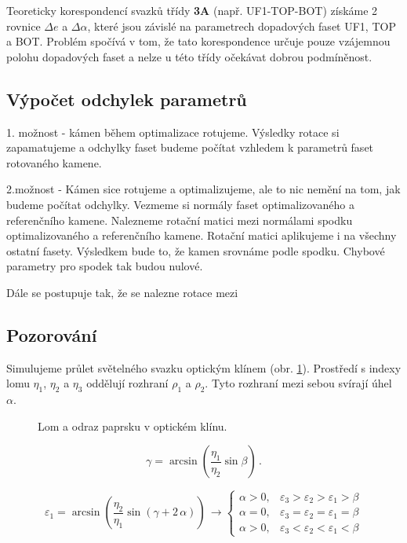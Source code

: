  
Teoreticky korespondencí svazků třídy \textbf{3A} (např. UF1-TOP-BOT) získáme 2 rovnice $\Delta e$ a $\Delta \alpha$, které jsou závislé na parametrech dopadových faset UF1, TOP a BOT. Problém spočívá v tom, že tato korespondence určuje pouze vzájemnou polohu dopadových faset a nelze u této třídy očekávat dobrou podmíněnost. 


\subsection{Výpočet odchylek parametrů}

1. možnost - kámen během optimalizace rotujeme. Výsledky rotace si zapamatujeme a odchylky faset budeme počítat vzhledem k parametrů faset rotovaného kamene. 

2.možnost - Kámen sice rotujeme a optimalizujeme, ale to nic nemění na tom, jak budeme počítat odchylky. Vezmeme si normály faset optimalizovaného a referenčního kamene. Nalezneme rotační matici mezi normálami spodku optimalizovaného a referenčního kamene. Rotační matici aplikujeme i na všechny ostatní fasety. Výsledkem bude to, že kamen srovnáme podle spodku. Chybové parametry pro spodek tak budou nulové.

Dále se postupuje tak, že se nalezne rotace mezi 

\subsection{Pozorování}

Simulujeme průlet světelného svazku optickým klínem (obr. \ref{fig:wedge}). Prostředí s indexy lomu $\eta_1$, $\eta_2$ a $\eta_3$ oddělují rozhraní $\rho_1$ a $\rho_2$. Tyto rozhraní mezi sebou svírají úhel $\alpha$.
\begin{figure}[h!]
\begin{center}
\scalebox{0.8}{ }
\end{center}
\caption{Lom a odraz paprsku v optickém klínu.}
\label{fig:wedge}
\end{figure}

\begin{equation}
\gamma = \arcsin{\left(\frac{\eta_1}{\eta_2}\sin{\beta}\right)}\,.
\end{equation}

\begin{equation}
\varepsilon_1 = \arcsin{\left(\frac{\eta_2}{\eta_1}\sin{\left(\gamma + 2\,\alpha\right)}\right)}\, 
\rightarrow \begin{cases}
\alpha > 0, & \varepsilon_3 > \varepsilon_2 > \varepsilon_1 > \beta\\
\alpha = 0, & \varepsilon_3 = \varepsilon_2 = \varepsilon_1 = \beta\\
\alpha > 0, & \varepsilon_3 < \varepsilon_2 < \varepsilon_1 < \beta
\end{cases}
\end{equation}


